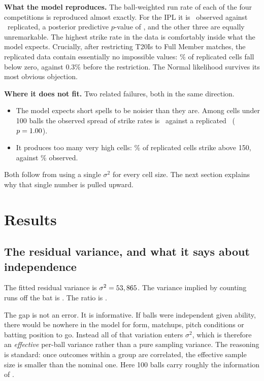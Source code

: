 \documentclass[11pt,a4paper]{article}
\begin{document}
\textbf{What the model reproduces.} The ball-weighted run rate of each of the four
competitions is reproduced almost exactly. For the IPL it is \nppcIplRate\ observed against
\nppcIplRateRep\ replicated, a posterior predictive $p$-value of \nppcIplP, and the other three
are equally unremarkable. The highest strike rate in the data is comfortably inside what the
model expects. Crucially, after restricting T20Is to Full Member matches, the replicated data
contain essentially no impossible values: \nppcNegative\% of replicated cells fall below
zero, against 0.3\% before the restriction. The Normal likelihood survives its most obvious
objection.

\textbf{Where it does not fit.} Two related failures, both in the same direction.

\begin{itemize}
\item The model expects short spells to be noisier than they are. Among cells under 100 balls
the observed spread of strike rates is \nppcSdSmall\ against a replicated \nppcSdSmallRep\
($p = 1.00$).
\item It produces too many very high cells: \nppcAboveRep\% of replicated cells strike above
150, against \nppcAbove\% observed.
\end{itemize}

Both follow from using a single $\sigma^2$ for every cell size. The next section explains why
that single number is pulled upward.

\section{Results}\label{sec:results}

\subsection{The residual variance, and what it says about independence}

The fitted residual variance is $\sigma^2 = 53,865$. The variance implied by counting
runs off the bat is \nsigmaSqBall. The ratio is \key{\ndesignEffect}.

The gap is not an error. It is informative. If balls were independent given ability, there
would be nowhere in the model for form, matchups, pitch conditions or batting position to go.
Instead all of that variation enters $\sigma^2$, which is therefore an \emph{effective}
per-ball variance rather than a pure sampling variance. The reasoning is standard: once
outcomes within a group are correlated, the effective sample size is smaller than the nominal
one. Here 100 balls carry roughly the information of \neffBalls.
\end{document}
